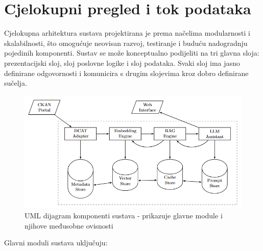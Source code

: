 \section{Cjelokupni pregled i tok podataka}

Cjelokupna arhitektura sustava projektirana je prema načelima modularnosti i skalabilnosti, što omogućuje neovisan razvoj, testiranje i buduću nadogradnju pojedinih komponenti. Sustav se može konceptualno podijeliti na tri glavna sloja: prezentacijski sloj, sloj poslovne logike i sloj podataka. Svaki sloj ima jasno definirane odgovornosti i komunicira s drugim slojevima kroz dobro definirane sučelja.

\begin{figure}[htbp]
    \centering
    \includegraphics[width=1\textwidth]{figures/system_architecture.png}
    \caption{UML dijagram komponenti sustava - prikazuje glavne module i njihove međusobne ovisnosti}
    \label{fig:system_components_uml}
\end{figure}

Glavni moduli sustava uključuju:

